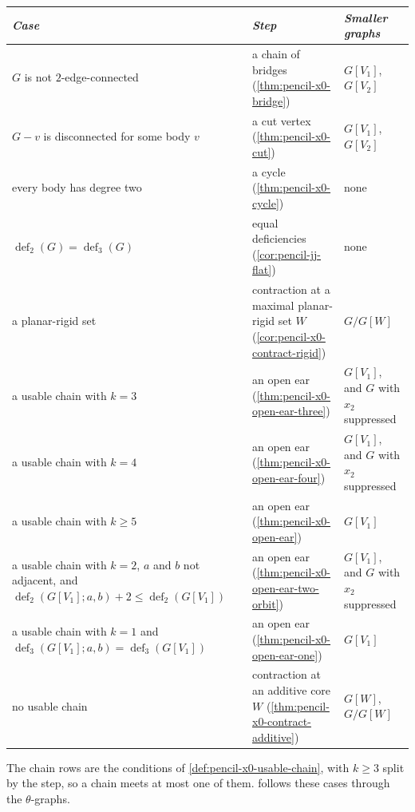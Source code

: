 \begin{center}
\begin{tabular}{p{5.4cm}p{4.4cm}p{2.8cm}}
  \raggedright \emph{Case}
    & \raggedright \emph{Step}
    & \raggedright \emph{Smaller graphs} \tabularnewline
  \hline
  \raggedright $G$ is not $2$-edge-connected
    & \raggedright a chain of bridges (\cref{thm:pencil-x0-bridge})
    & \raggedright $G[V_1]$, $G[V_2]$ \tabularnewline
  \raggedright $G - v$ is disconnected for some body $v$
    & \raggedright a cut vertex (\cref{thm:pencil-x0-cut})
    & \raggedright $G[V_1]$, $G[V_2]$ \tabularnewline
  \raggedright every body has degree two
    & \raggedright a cycle (\cref{thm:pencil-x0-cycle})
    & \raggedright none \tabularnewline
  \raggedright $\operatorname{def}_2(G) = \operatorname{def}_3(G)$
    & \raggedright equal deficiencies (\cref{cor:pencil-jj-flat})
    & \raggedright none \tabularnewline
  \raggedright a planar-rigid set
    & \raggedright contraction at a maximal planar-rigid set $W$
      (\cref{cor:pencil-x0-contract-rigid})
    & \raggedright $G/G[W]$ \tabularnewline
  \raggedright a usable chain with $k = 3$
    & \raggedright an open ear (\cref{thm:pencil-x0-open-ear-three})
    & \raggedright $G[V_1]$, and $G$ with $x_2$ suppressed \tabularnewline
  \raggedright a usable chain with $k = 4$
    & \raggedright an open ear (\cref{thm:pencil-x0-open-ear-four})
    & \raggedright $G[V_1]$, and $G$ with $x_2$ suppressed \tabularnewline
  \raggedright a usable chain with $k \ge 5$
    & \raggedright an open ear (\cref{thm:pencil-x0-open-ear})
    & \raggedright $G[V_1]$ \tabularnewline
  \raggedright a usable chain with $k = 2$, $a$ and $b$ not adjacent,
    and $\operatorname{def}_2(G[V_1]; a, b) + 2 \le
    \operatorname{def}_2(G[V_1])$
    & \raggedright an open ear (\cref{thm:pencil-x0-open-ear-two-orbit})
    & \raggedright $G[V_1]$, and $G$ with $x_2$ suppressed \tabularnewline
  \raggedright a usable chain with $k = 1$ and
    $\operatorname{def}_3(G[V_1]; a, b) = \operatorname{def}_3(G[V_1])$
    & \raggedright an open ear (\cref{thm:pencil-x0-open-ear-one})
    & \raggedright $G[V_1]$ \tabularnewline
  \raggedright no usable chain
    & \raggedright contraction at an additive core $W$
      (\cref{thm:pencil-x0-contract-additive})
    & \raggedright $G[W]$, $G/G[W]$ \tabularnewline
\end{tabular}
\end{center}
The chain rows are the conditions of \cref{def:pencil-x0-usable-chain},
with $k \ge 3$ split by the step, so a chain meets at most one of them.
 follows these cases through the
$\theta$-graphs.

